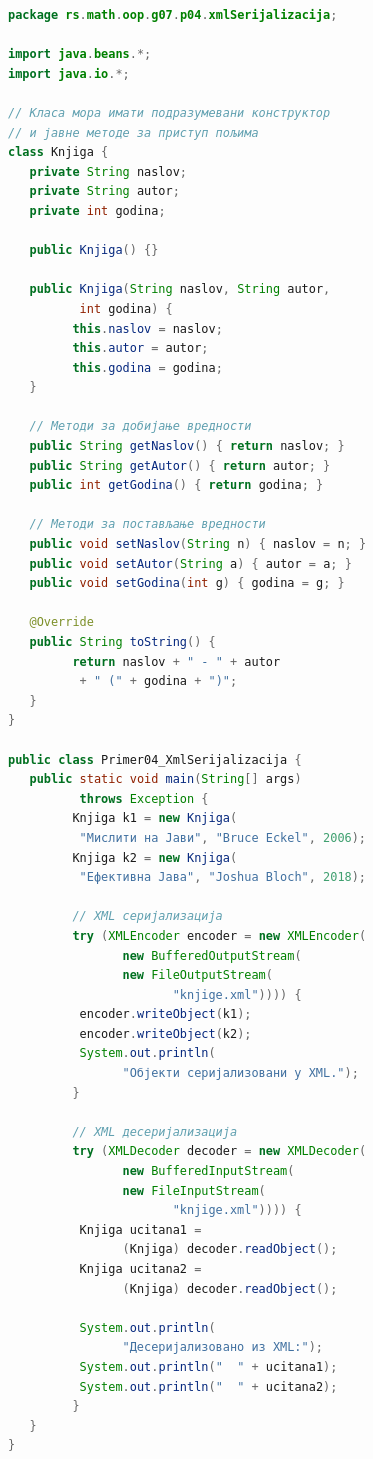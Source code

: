 \begin{lstlisting}[language=Java]
package rs.math.oop.g07.p04.xmlSerijalizacija;
 
import java.beans.*;
import java.io.*;
 
// Класа мора имати подразумевани конструктор
// и јавне методе за приступ пољима
class Knjiga {
   private String naslov;
   private String autor;
   private int godina;
 
   public Knjiga() {}
 
   public Knjiga(String naslov, String autor,
          int godina) {
         this.naslov = naslov;
         this.autor = autor;
         this.godina = godina;
   }
 
   // Методи за добијање вредности
   public String getNaslov() { return naslov; }
   public String getAutor() { return autor; }
   public int getGodina() { return godina; }
 
   // Методи за постављање вредности
   public void setNaslov(String n) { naslov = n; }
   public void setAutor(String a) { autor = a; }
   public void setGodina(int g) { godina = g; }
 
   @Override
   public String toString() {
         return naslov + " - " + autor
          + " (" + godina + ")";
   }
}
 
public class Primer04_XmlSerijalizacija {
   public static void main(String[] args)
          throws Exception {
         Knjiga k1 = new Knjiga(
          "Мислити на Јави", "Bruce Eckel", 2006);
         Knjiga k2 = new Knjiga(
          "Ефективна Јава", "Joshua Bloch", 2018);
 
         // XML серијализација
         try (XMLEncoder encoder = new XMLEncoder(
                new BufferedOutputStream(
                new FileOutputStream(
                       "knjige.xml")))) {
          encoder.writeObject(k1);
          encoder.writeObject(k2);
          System.out.println(
                "Објекти серијализовани у XML.");
         }
 
         // XML десеријализација
         try (XMLDecoder decoder = new XMLDecoder(
                new BufferedInputStream(
                new FileInputStream(
                       "knjige.xml")))) {
          Knjiga ucitana1 =
                (Knjiga) decoder.readObject();
          Knjiga ucitana2 =
                (Knjiga) decoder.readObject();
 
          System.out.println(
                "Десеријализовано из XML:");
          System.out.println("  " + ucitana1);
          System.out.println("  " + ucitana2);
         }
   }
}
\end{lstlisting}


